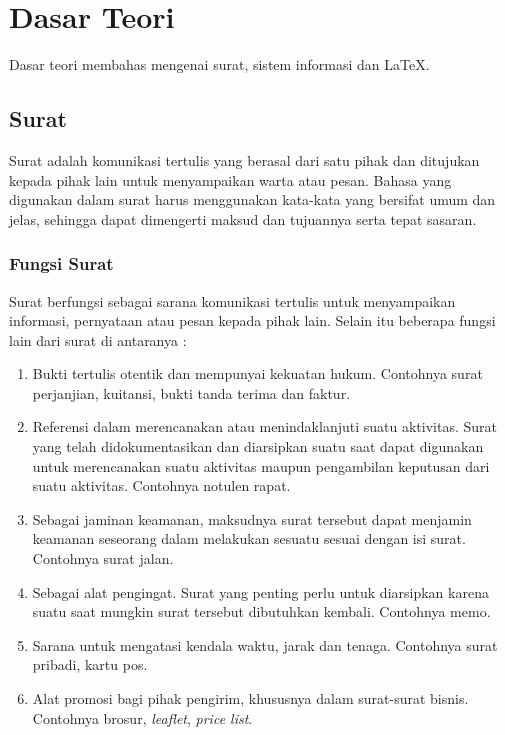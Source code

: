 \chapter{Dasar Teori}
\label{chap:dasar_teori}
Dasar teori membahas mengenai surat, sistem informasi dan \LaTeX.

\section{Surat}
\label{sec:surat}
Surat adalah komunikasi tertulis yang berasal dari satu pihak dan ditujukan kepada pihak lain untuk menyampaikan warta atau pesan. Bahasa yang digunakan dalam surat harus menggunakan kata-kata yang bersifat umum dan jelas, sehingga dapat dimengerti maksud dan tujuannya serta tepat sasaran\cite{Saiman:2002}.

\subsection{Fungsi Surat}
\label{sec:fungsi_surat}
Surat berfungsi sebagai sarana komunikasi tertulis untuk menyampaikan informasi, pernyataan atau pesan kepada pihak lain. Selain itu beberapa fungsi lain dari surat di antaranya \cite{Saiman:2002}:
\begin{enumerate}
	\item Bukti tertulis otentik dan mempunyai kekuatan hukum. Contohnya surat perjanjian, kuitansi, bukti tanda terima dan faktur.
	\item Referensi dalam merencanakan atau menindaklanjuti suatu aktivitas. Surat yang telah didokumentasikan dan diarsipkan suatu saat dapat digunakan untuk merencanakan suatu aktivitas maupun pengambilan keputusan dari suatu aktivitas. Contohnya notulen rapat.
	\item Sebagai jaminan keamanan, maksudnya surat tersebut dapat menjamin keamanan seseorang dalam melakukan sesuatu sesuai dengan isi surat. Contohnya surat jalan.
	\item Sebagai alat pengingat. Surat yang penting perlu untuk diarsipkan karena suatu saat mungkin surat tersebut dibutuhkan kembali. Contohnya memo.
	\item Sarana untuk mengatasi kendala waktu, jarak dan tenaga. Contohnya surat pribadi, kartu pos. 
	\item Alat promosi bagi pihak pengirim, khususnya dalam surat-surat bisnis. Contohnya brosur, \textit{leaflet}, \textit{price list}.
\end{enumerate}

